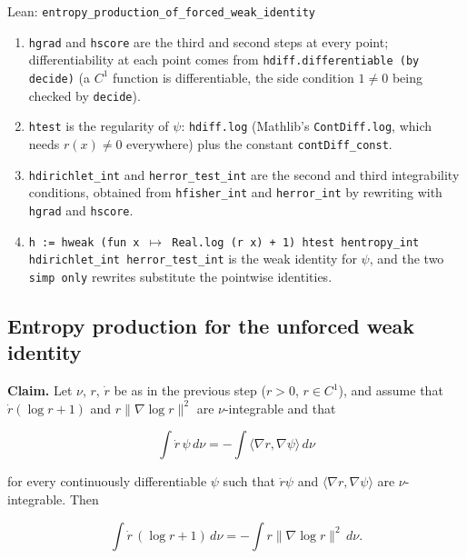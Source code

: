 \documentclass[11pt,a4paper]{report}
\begin{document}
\begin{leanbox}{Lean: \texttt{entropy\_\allowbreak{}production\_\allowbreak{}of\_\allowbreak{}forced\_\allowbreak{}weak\_\allowbreak{}identity}}
\begin{enumerate}
\item \texttt{hgrad} and \texttt{hscore} are the third and second steps at every point; differentiability at each point comes from \texttt{hdiff.\allowbreak{}differentiable (by decide)} (a \(C^1\) function is differentiable, the side condition \(1\neq0\) being checked by \texttt{decide}).

\item \texttt{htest} is the regularity of \(\psi\): \texttt{hdiff.\allowbreak{}log} (Mathlib's \texttt{Cont\allowbreak{}Diff.\allowbreak{}log}, which needs \(r(x)\neq0\) everywhere) plus the constant \texttt{cont\allowbreak{}Diff\_\allowbreak{}const}.

\item \texttt{hdirichlet\_\allowbreak{}int} and \texttt{herror\_\allowbreak{}test\_\allowbreak{}int} are the second and third integrability conditions, obtained from \texttt{hfisher\_\allowbreak{}int} and \texttt{herror\_\allowbreak{}int} by rewriting with \texttt{hgrad} and \texttt{hscore}.

\item \texttt{h := hweak (fun x \ensuremath{\mapsto} Real.\allowbreak{}log (r x) + 1) htest hentropy\_\allowbreak{}int hdirichlet\_\allowbreak{}int herror\_\allowbreak{}test\_\allowbreak{}int} is the weak identity for \(\psi\), and the two \texttt{simp only} rewrites substitute the pointwise identities.

\end{enumerate}
\end{leanbox}
\subsection{\texorpdfstring{Entropy production for the unforced weak identity}{Entropy production for the unforced weak identity}}
\label{report-step-UnadjustedLangevin-LSI-ScoreCalculus-lean-5}


\textbf{Claim.} Let \(\nu\), \(r\), \(\dot r\) be as in the previous step (\(r>0\), \(r\in C^1\)), and assume that \(\dot r(\log r+1)\) and \(r\|\nabla\log r\|^2\) are \(\nu\)-integrable and that


\[\int\dot r\,\psi\,d\nu=-\int\langle\nabla r,\nabla\psi\rangle\,d\nu\]


for every continuously differentiable \(\psi\) such that \(\dot r\psi\) and \(\langle\nabla r,\nabla\psi\rangle\) are \(\nu\)-integrable. Then


\[\int\dot r\,(\log r+1)\,d\nu=-\int r\|\nabla\log r\|^2\,d\nu.\]
\end{document}
